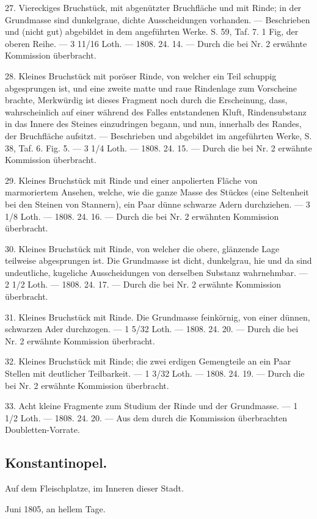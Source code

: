 \documentclass[a4paper, 11pt, oneside, polutonikogreek, german]{article}
\begin{document}
27. Viereckiges Bruchstück, mit abgenützter Bruchfläche und mit Rinde; in der Grundmasse sind dunkelgraue, dichte Ausscheidungen vorhanden. — Beschrieben und (nicht gut) abgebildet in dem angeführten Werke. S. 59, Taf. 7. 1 Fig, der oberen Reihe. — 3 11/16 Loth. — 1808. 24. 14. — Durch die bei Nr. 2 erwähnte Kommission überbracht.

28. Kleines Bruchstück mit poröser Rinde, von welcher ein Teil schuppig abgesprungen ist, und eine zweite matte und raue Rindenlage zum Vorscheine brachte, Merkwürdig ist dieses Fragment noch durch die Erscheinung, dass, wahrscheinlich auf einer während des Falles entstandenen Kluft, Rindensubstanz in das Innere des Steines einzudringen begann, und nun, innerhalb des Randes, der Bruchfläche aufsitzt. — Beschrieben und abgebildet im angeführten Werke, S. 38, Taf. 6. Fig. 5. — 3 1/4 Loth. — 1808. 24. 15. — Durch die bei Nr. 2 erwähnte Kommission überbracht.

29. Kleines Bruchstück mit Rinde und einer anpolierten Fläche von marmoriertem Ansehen, welche, wie die ganze Masse des Stückes (eine Seltenheit bei den Steinen von Stannern), ein Paar dünne schwarze Adern durchziehen. — 3 1/8 Loth. — 1808. 24. 16. — Durch die bei Nr. 2 erwähnten Kommission überbracht.

30. Kleines Bruchstück mit Rinde, von welcher die obere, glänzende Lage teilweise abgesprungen ist. Die Grundmasse ist dicht, dunkelgrau, hie und da sind undeutliche, kugeliche Ausscheidungen von derselben Substanz wahrnehmbar. — 2 1/2 Loth. — 1808. 24. 17. — Durch die bei Nr. 2 erwähnte Kommission überbracht.

31. Kleines Bruchstück mit Rinde. Die Grundmasse feinkörnig, von einer dünnen, schwarzen Ader durchzogen. — 1 5/32 Loth. — 1808. 24. 20. — Durch die bei Nr. 2 erwähnte Kommission überbracht.

32. Kleines Bruchstück mit Rinde; die zwei erdigen Gemengteile an ein Paar Stellen mit deutlicher Teilbarkeit. — 1 3/32 Loth. — 1808. 24. 19. — Durch die bei Nr. 2 erwähnte Kommission überbracht.

33. Acht kleine Fragmente zum Studium der Rinde und der Grundmasse. — 1 1/2 Loth. — 1808. 24. 20. — Aus dem durch die Kommission überbrachten Doubletten-Vorrate.
\subsection{Konstantinopel.}
\begin{center}
\small
Auf dem Fleischplatze, im Inneren dieser Stadt.

Juni 1805, an hellem Tage.
\end{center}
\end{document}
